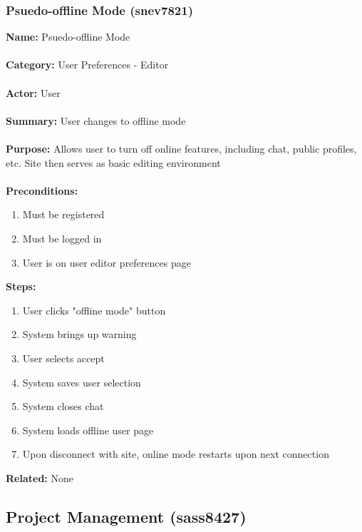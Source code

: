 \documentclass[11pt]{report}
\begin{document}
\subsubsection{Psuedo-offline Mode (snev7821)}
\begin{framed}
	\noindent\textbf{Name:} Psuedo-offline Mode \\ \\
	\textbf{Category:} User Preferences - Editor  \\ \\
	\textbf{Actor:} User \\ \\
	\textbf{Summary:} User changes to offline mode \\ \\
	\textbf{Purpose:} Allows user to turn off online features, including chat, public profiles, etc. Site then serves as basic editing environment\\ \\
	\textbf{Preconditions:} 
	\begin{enumerate}
		\item Must be registered
		\item Must be logged in
		\item User is on user editor preferences page
	\end{enumerate}
	\textbf{Steps:}
	\begin{enumerate}
		\item User clicks "offline mode" button
		\item System brings up warning
		\item User selects accept
		\item System saves user selection
		\item System closes chat
		\item System loads offline user page
		\item Upon disconnect with site, online mode restarts upon next connection
	\end{enumerate}
	\textbf{Related:} None 
\end{framed}



\subsection{Project Management (sass8427)}
\end{document}
